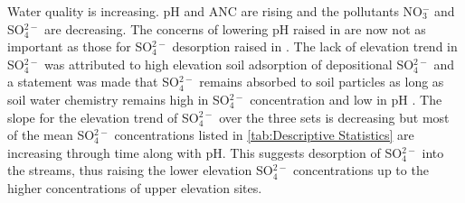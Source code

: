 Water quality is increasing.  
pH and ANC are rising and the pollutants NO$_3^-$ and SO$_4^{2-}$ are decreasing.  
The concerns of lowering pH raised in \citet{robinson2008ph} are now not as important as those for SO$_4^{2-}$ desorption raised in \citet{cai2013}.  
The lack of elevation trend in SO$_4^{2-}$ was attributed to high elevation soil adsorption of depositional SO$_4^{2-}$ and a statement was made that SO$_4^{2-}$ remains absorbed to soil particles as long as soil water chemistry remains high in SO$_4^{2-}$ concentration and low in pH \citep{cai2011long}.  
The slope for the elevation trend of SO$_4^{2-}$ over the three sets is decreasing but most of the mean SO$_4^{2-}$ concentrations listed in \autoref{tab:Descriptive Statistics} are increasing through time along with pH.
This suggests desorption of SO$_4^{2-}$ into the streams, thus raising the lower elevation SO$_4^{2-}$ concentrations up to the higher concentrations of upper elevation sites.


  
